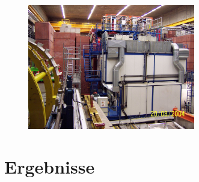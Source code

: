 \documentclass[aspectratio=1610, 9pt]{beamer}
\begin{document}
\begin{frame}
  \begin{figure}
    \centering
    \includegraphics[width=0.65\textwidth]{images/H1_detector.jpg}
  \end{figure}
\end{frame}


\section{Ergebnisse}
\end{document}
